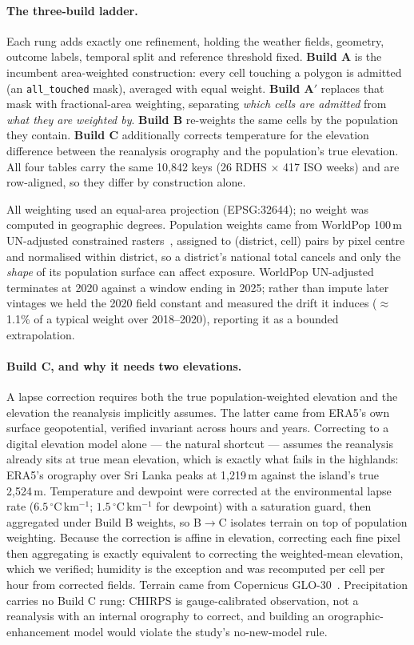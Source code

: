 \documentclass[11pt,a4paper]{article}
\begin{document}
\paragraph{The three-build ladder.} Each rung adds exactly one refinement, holding the weather fields, geometry, outcome labels, temporal split and reference threshold fixed. \textbf{Build A} is the incumbent area-weighted construction: every cell touching a polygon is admitted (an \texttt{all\_touched} mask), averaged with equal weight. \textbf{Build A$'$} replaces that mask with fractional-area weighting, separating \emph{which cells are admitted} from \emph{what they are weighted by}. \textbf{Build B} re-weights the same cells by the population they contain. \textbf{Build C} additionally corrects temperature for the elevation difference between the reanalysis orography and the population's true elevation. All four tables carry the same 10{,}842 keys (26 RDHS $\times$ 417 ISO weeks) and are row-aligned, so they differ by construction alone.

All weighting used an equal-area projection (EPSG:32644); no weight was computed in geographic degrees. Population weights came from WorldPop 100\,m UN-adjusted constrained rasters~\cite{Tatem2017,WorldPop2025}, assigned to (district, cell) pairs by pixel centre and normalised within district, so a district's national total cancels and only the \emph{shape} of its population surface can affect exposure. WorldPop UN-adjusted terminates at 2020 against a window ending in 2025; rather than impute later vintages we held the 2020 field constant and measured the drift it induces ($\approx$1.1\% of a typical weight over 2018--2020), reporting it as a bounded extrapolation.

\paragraph{Build C, and why it needs two elevations.} A lapse correction requires both the true population-weighted elevation and the elevation the reanalysis implicitly assumes. The latter came from ERA5's own surface geopotential, verified invariant across hours and years. Correcting to a digital elevation model alone --- the natural shortcut --- assumes the reanalysis already sits at true mean elevation, which is exactly what fails in the highlands: ERA5's orography over Sri Lanka peaks at 1{,}219\,m against the island's true 2{,}524\,m. Temperature and dewpoint were corrected at the environmental lapse rate ($6.5\,^{\circ}$C\,km$^{-1}$; $1.5\,^{\circ}$C\,km$^{-1}$ for dewpoint) with a saturation guard, then aggregated under Build B weights, so B$\to$C isolates terrain on top of population weighting. Because the correction is affine in elevation, correcting each fine pixel then aggregating is exactly equivalent to correcting the weighted-mean elevation, which we verified; humidity is the exception and was recomputed per cell per hour from corrected fields. Terrain came from Copernicus GLO-30~\cite{CopernicusDEM2021}. Precipitation carries no Build C rung: CHIRPS is gauge-calibrated observation, not a reanalysis with an internal orography to correct, and building an orographic-enhancement model would violate the study's no-new-model rule.
\end{document}
